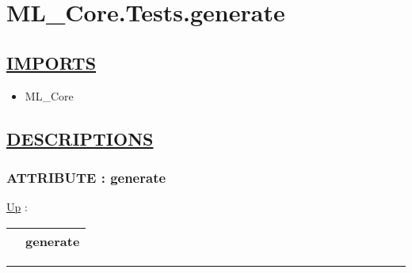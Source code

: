 \chapter*{ML\_Core.Tests.generate}
\hypertarget{ecldoc:toc:ML_Core.Tests.generate}{}

\section*{\underline{IMPORTS}}
\begin{itemize}
\item ML\_Core
\end{itemize}

\section*{\underline{DESCRIPTIONS}}
\subsection*{ATTRIBUTE : generate}
\hypertarget{ecldoc:ml_core.tests.generate}{}
\hyperlink{ecldoc:toc:ML_Core/Tests}{Up} :

{\renewcommand{\arraystretch}{1.5}
\begin{tabularx}{\textwidth}{|>{\raggedright\arraybackslash}l|X|}
\hline
\hspace{0pt} & generate \\
\hline
\end{tabularx}
}

\par


\rule{\linewidth}{0.5pt}
